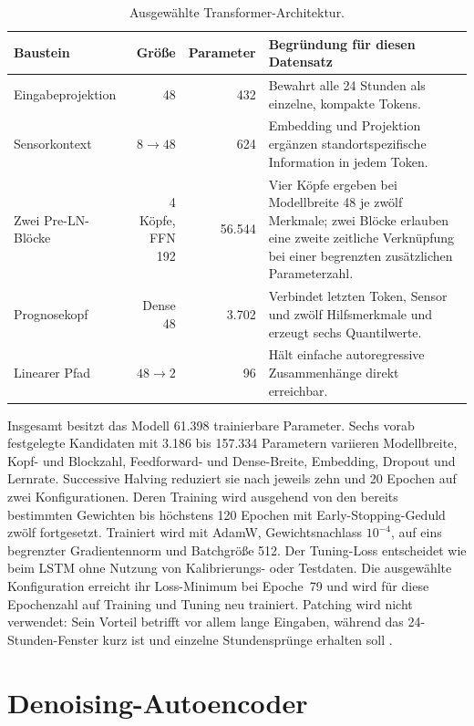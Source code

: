 \begin{table}[htb]
  \centering
  \small
  \caption{Ausgewählte Transformer-Architektur.}
  \label{tab:transformer_architektur}
  \begin{tabularx}{\textwidth}{lrrX}
    \hline
    Baustein & Größe & Parameter & Begründung für diesen Datensatz \\
    \hline
    Eingabeprojektion & 48 & 432 & Bewahrt alle 24 Stunden als einzelne,
      kompakte Tokens. \\
    Sensorkontext & $8\rightarrow48$ & 624 & Embedding und Projektion ergänzen
      standortspezifische Information in jedem Token. \\
    Zwei Pre-LN-Blöcke & 4 Köpfe, FFN 192 & 56.544 & Vier Köpfe ergeben bei
      Modellbreite 48 je zwölf Merkmale; zwei Blöcke erlauben eine zweite
      zeitliche Verknüpfung bei einer begrenzten zusätzlichen Parameterzahl. \\
    Prognosekopf & Dense 48 & 3.702 & Verbindet letzten Token, Sensor und
      zwölf Hilfsmerkmale und erzeugt sechs Quantilwerte. \\
    Linearer Pfad & $48\rightarrow2$ & 96 & Hält einfache autoregressive
      Zusammenhänge direkt erreichbar. \\
    \hline
  \end{tabularx}
\end{table}
\FloatBarrier

Insgesamt besitzt das Modell 61.398 trainierbare Parameter. Sechs vorab
festgelegte Kandidaten mit 3.186 bis 157.334 Parametern variieren
Modellbreite, Kopf- und Blockzahl, Feedforward- und Dense-Breite, Embedding,
Dropout und Lernrate. Successive Halving reduziert sie nach jeweils zehn und
20 Epochen auf zwei Konfigurationen. Deren Training wird ausgehend von den
bereits bestimmten Gewichten bis höchstens 120 Epochen mit
Early-Stopping-Geduld zwölf fortgesetzt. Trainiert wird mit AdamW,
Gewichtsnachlass $10^{-4}$, auf eins begrenzter Gradientennorm und Batchgröße
512. Der Tuning-Loss entscheidet wie beim LSTM ohne Nutzung von
Kalibrierungs- oder Testdaten. Die ausgewählte Konfiguration erreicht ihr
Loss-Minimum bei Epoche~79 und wird für diese Epochenzahl auf Training und
Tuning neu trainiert. Patching wird nicht verwendet: Sein Vorteil betrifft vor
allem lange Eingaben, während das 24-Stunden-Fenster kurz ist und einzelne
Stundensprünge erhalten soll \cite{nie2023patchtst}.

\section[Autoencoder]{Denoising-Autoencoder}
\label{sec:Methode_Autoencoder}

